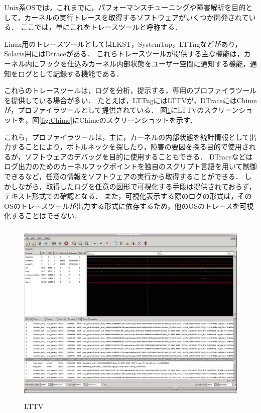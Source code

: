 Unix系OSでは，これまでに，パフォーマンスチューニングや障害解析を目的として，カーネルの実行トレースを取得するソフトウェアがいくつか開発されている．
ここでは，単にこれをトレースツールと呼称する．

Linux用のトレースツールとしてはLKST\cite{LKST}，SystemTap\cite{SystemTap}，LTTng\cite{LTTng}などがあり，Solaris用にはDtrace\cite{Dtrace}がある．
これらトレースツールが提供する主な機能は，カーネル内にフックを仕込みカーネル内部状態をユーザー空間に通知する機能，通知をログとして記録する機能である．

これらのトレースツールは，ログを分析，提示する，専用のプロファイラツールを提供している場合が多い．
たとえば，LTTngにはLTTV\cite{LTTV}が，DTraceにはChime\cite{Chime}が，プロファイラツールとして提供されている．
図\ref{fig:LTTV}にLTTVのスクリーンショットを，図\ref{fig:Chime}にChimeのスクリーンショットを示す．

これら，プロファイラツールは，主に，カーネルの内部状態を統計情報として出力することにより，ボトルネックを探したり，障害の要因を探る目的で使用されるが，ソフトウェアのデバッグを目的に使用することもできる．
DTraceなどはログ出力のためのカーネルフックポイントを独自のスクリプト言語を用いて制御できるなど，任意の情報をソフトウェアの実行から取得することができる．
しかしながら，取得したログを任意の図形で可視化する手段は提供されておらず，テキスト形式での確認となる．
また，可視化表示する際のログの形式は，そのOSのトレースツールが出力する形式に依存するため，他のOSのトレースを可視化することはできない．

\begin{figure}[p]
\begin{center}
\includegraphics[height=9cm]{img/LTTV.eps}
\caption{LTTV}
\label{fig:LTTV}
\end{center}
\end{figure}

